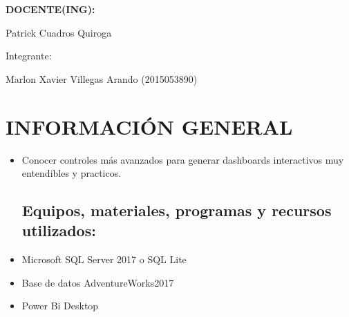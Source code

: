 \documentclass[12pt,letterpaper]{article}
\begin{document}
\begin{titlepage}
\begin{center}
\vspace*{0.3in}
\begin{Large}
\textbf{DOCENTE(ING):} \\
\end{Large}

\vspace*{0.1in}
\begin{large}
 Patrick Cuadros Quiroga\\
\end{large}

\vspace*{0.2in}
\vspace*{0.1in}
\begin{large}
Integrante: \\
\begin{flushleft}
Marlon Xavier Villegas Arando	\hfill	(2015053890) 
\end{flushleft}
\end{large}
\end{center}

\end{titlepage}



\thispagestyle{empty} %
\newpage
\setcounter{page}{1} %

\section{INFORMACIÓN GENERAL}
	\begin{itemize}
\subsection{Objetivos:}
	\item Conocer controles más avanzados para generar dashboards interactivos muy entendibles y practicos.
\subsection{Equipos, materiales, programas y recursos utilizados:}
	\item Microsoft SQL Server 2017 o SQL Lite
	\item Base de datos AdventureWorks2017
	\item Power Bi Desktop
\end{itemize}
\end{document}
